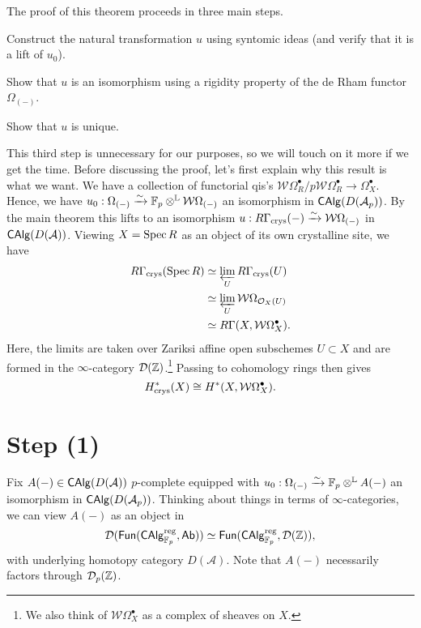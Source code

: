 \documentclass[11pt]{article}
\renewcommand{\A}{\mathcal{A}}
\newcommand{\W}{\mathcal{W}} %
\begin{document}
The proof of this theorem proceeds in three main steps.
\begin{enum}{\arabic}
\item Construct the natural transformation $u$ using syntomic ideas (and verify that it is a lift of $u_0$).

\item Show that $u$ is an isomorphism using a rigidity property of the de Rham functor $\Omega_{(-)}$.

\item Show that $u$ is unique.
\end{enum}

This third step is unnecessary for our purposes, so we will touch on it more if we get the time. Before discussing the proof, let's first explain why this result is what we want. We have a collection of functorial qis's $\W\Omega_R^{\bullet}/p\W\Omega_R^{\bullet}\to\Omega_X^{\bullet}$. Hence, we have $u_0: \Omega_{(-)}\xto{\sim}\F_p\Ltensor\W\Omega_{(-)}$ an isomorphism in $\CAlg(D(\A_p))$. By the main theorem this lifts to an isomorphism $u: R\Gamma_{\crys}(-)\xto{\sim}\W\Omega_{(-)}$ in $\CAlg(D(\A))$. Viewing $X=\operatorname{Spec} R$ as an object of its own crystalline site, we have
\begin{align*}
R\Gamma_{\crys}(\Spec R)
&\simeq\flim_UR\Gamma_{\crys}(U) \\
&\simeq\flim_U\W\Omega_{\O_X(U)} \\
&\simeq R\Gamma(X,\W\Omega_X^{\bullet}).
\end{align*}
Here, the limits are taken over Zariksi affine open subschemes $U\subset X$ and are formed in the $\infty$-category $\mathcal{D}(\mathbb{Z})$.\footnote{We also think of $\W\Omega_X^{\bullet}$ as a complex of sheaves on $X$.} Passing to cohomology rings then gives 
$$H_{\crys}^*(X)\iso H^*(X,\W\Omega_X^{\bullet}).$$

\section*{Step (1)}
Fix $A(-)\in\CAlg(D(\A))$ $p$-complete equipped with $u_0: \Omega_{(-)}\xrightarrow{\sim}\mathbb{F}_p\otimes^{\mathbb{L}} A(-)$ an isomorphism in $\CAlg(D(\A_p))$. Thinking about things in terms of $\infty$-categories, we can view $A(-)$ as an object in
$$\mathcal{D}(\operatorname{\mathsf{Fun}}(\operatorname{\mathsf{CAlg}}_{\mathbb{F}_p}^{\operatorname{reg}},\operatorname{\mathsf{Ab}}))\simeq\operatorname{\mathsf{Fun}}(\operatorname{\mathsf{CAlg}}_{\mathbb{F}_p}^{\operatorname{reg}},\mathcal{D}(\mathbb{Z})),$$
with underlying homotopy category $D(\A)$. Note that $A(-)$ necessarily factors through $\mathcal{D}_p(\mathbb{Z})$.
\end{document}
